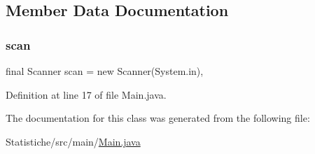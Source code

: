 \subsection{Member Data Documentation}
\mbox{\label{classmain_1_1_main_ad2b26d92ead66c3a1c4e4d4d77394aba}} 
\subsubsection{\texorpdfstring{scan}{scan}}
{\footnotesize\ttfamily final Scanner scan = new Scanner(System.\+in)\hspace{0.3cm}{\ttfamily [static]}, {\ttfamily [private]}}



Definition at line 17 of file Main.\+java.



The documentation for this class was generated from the following file\+:\begin{DoxyCompactItemize}
\item 
Statistiche/src/main/\mbox{\hyperlink{_main_8java}{Main.\+java}}\end{DoxyCompactItemize}
